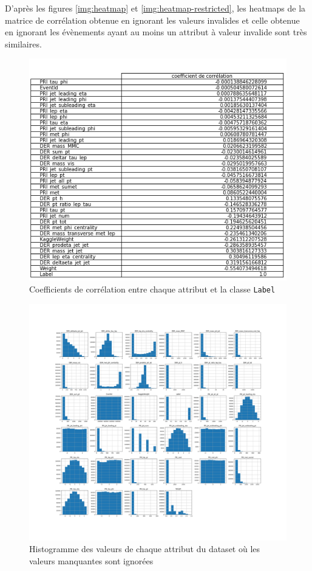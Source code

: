 \documentclass[12pt]{article}
\begin{document}
D'après les figures \ref{img:heatmap} et \ref{img:heatmap-restricted}, les
heatmaps de la matrice de corrélation obtenue en ignorant les valeurs invalides
et celle obtenue en ignorant les évènements ayant au moins un attribut à valeur
invalide sont très similaires.

\begin{figure}[H]
    \center 
    \includegraphics[width=\textwidth]{images/table_corr.png}
    \caption{Coefficients de corrélation entre chaque attribut et la classe
    \texttt{Label}}
    \label{img:table-corr}
\end{figure}

\begin{figure}[H]
    \center 
    \includegraphics[width=\textwidth]{images/histogrammes.png}
    \caption{Histogramme des valeurs de chaque attribut du dataset où les
    valeurs manquantes sont ignorées}
    \label{img:hist}
\end{figure}
\end{document}
